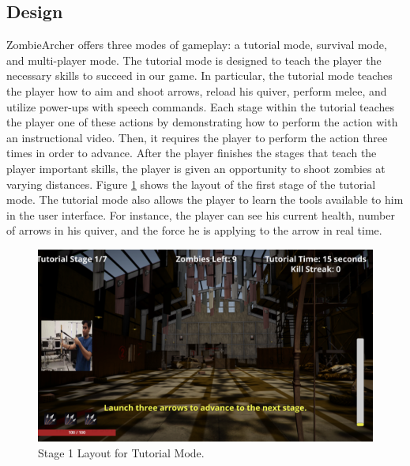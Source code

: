\documentclass[titlepage, 12pt]{scrartcl}
\begin{document}
    \subsection{Design}
    ZombieArcher offers three modes of gameplay: a tutorial mode, survival mode, and multi-player mode. The tutorial mode is designed to teach the player the necessary skills to succeed in our game. In particular, the tutorial mode teaches the player how to aim and shoot arrows, reload his quiver, perform melee, and utilize power-ups with speech commands. Each stage within the tutorial teaches the player one of these actions by demonstrating how to perform the action with an instructional video. Then, it requires the player to perform the action three times in order to advance. After the player finishes the stages that teach the player important skills, the player is given an opportunity to shoot zombies at varying distances. Figure \ref{fig:tutorial} shows the layout of the first stage of the tutorial mode. The tutorial mode also allows the player to learn the tools available to him in the user interface. For instance, the player can see his current health, number of arrows in his quiver, and the force he is applying to the arrow in real time. 
        \begin{figure}
            \centering
            \includegraphics[scale=0.3]{figures/tutorial.png}
            \caption{Stage 1 Layout for Tutorial Mode.}
            \label{fig:tutorial}
        \end{figure}
    \par
\end{document}
